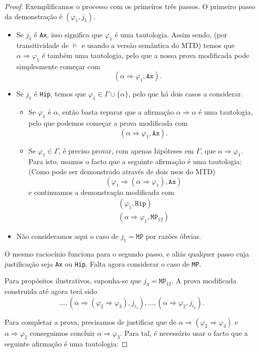 \documentclass{report}
\theoremstyle{definition}
\theoremstyle{remark}
\newcommand{\imply}{\mathbin{\Rightarrow}}
\begin{document}
\begin{proof}
	Exemplificamos o processo com os primeiros três passos. O primeiro passo da demonstração é $(\varphi_1, j_1)$.
	
	\begin{itemize}
	\item Se $j_1$ é \texttt{Ax}, isso significa que $\varphi_1$ é uma tautologia. Assim sendo, (por transitividade de $\vDash$ e usando a versão semântica do MTD) temos que $\alpha \imply \varphi_1$ é também uma tautologia, pelo que a nossa prova modificada pode simplesmente começar com
	\[(\alpha \imply \varphi_1, \texttt{Ax}).\]
	
	\item Se $j_1$ é \texttt{Hip}, temos que $\varphi_1 \in \Gamma \cup \{\alpha\}$, pelo que há dois casos a considerar.
	\begin{itemize}
	\item Se $\varphi_1$ é $\alpha$, então basta reparar que a afirmação $\alpha \imply \alpha$ é uma tautologia, pelo que podemos começar a prova modificada com
	\[(\alpha \imply \varphi_1, \texttt{Ax}).\]
	
	\item Se $\varphi_1 \in \Gamma$, é preciso provar, com apenas hipóteses em $\Gamma$, que $\alpha \imply \varphi_1$. Para isto, usamos o facto que a seguinte afirmação é uma tautologia: (Como pode ser demonstrado através de dois usos do MTD)
	\[(\varphi_1 \imply (\alpha \imply \varphi_1), \texttt{Ax})\]
	e continuamos a demonstração modificada com
	\begin{gather*}
	(\varphi_1, \texttt{Hip})\\
	(\alpha \imply \varphi_1, \texttt{MP}_{12})
	\end{gather*}
	\end{itemize}
	
	\item Não consideramos aqui o caso de $j_1 = \texttt{MP}$ por razões óbvias.
	\end{itemize}
	
	O mesmo raciocínio funciona para o segundo passo, e aliás qualquer passo cuja justificação seja \texttt{Ax} ou \texttt{Hip}. Falta agora considerar o caso de \texttt{MP}.
	
	Para propósitos ilustrativos, suponha-se que $j_3 = \texttt{MP}_{12}$. A prova modificada construida até agora terá sido
	\[\dots, (\alpha \imply (\varphi_2 \imply \varphi_3), j_{i_1}), \dots, (\alpha \imply \varphi_2, j_{i_2}).\]
	
	Para completar a prova, precisamos de justificar que de $\alpha \imply (\varphi_2 \imply \varphi_3)$ e $\alpha \imply \varphi_2$ conseguimos concluir $\alpha \imply \varphi_3$.  Para tal, é necessário usar o facto que a seguinte afirmação é uma tautologia:
	

\end{proof}
\end{document}
